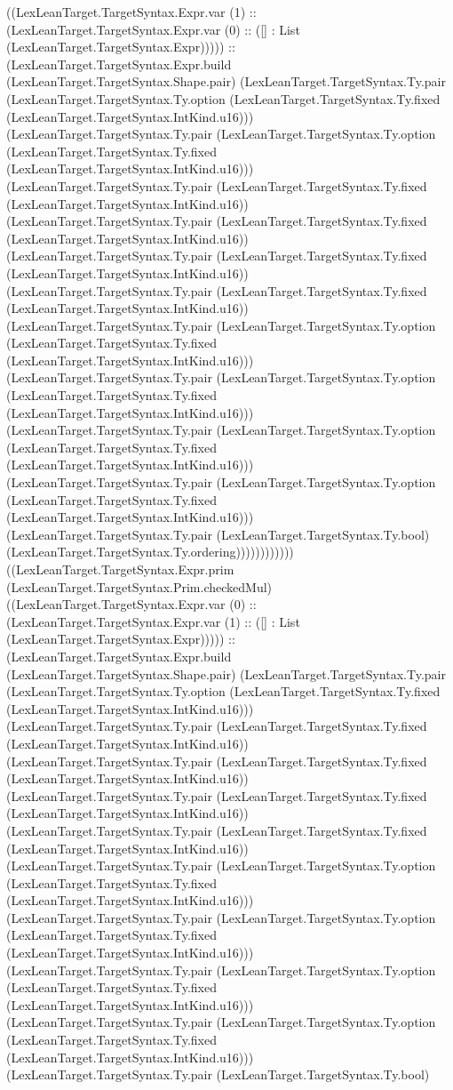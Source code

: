 \documentclass[11pt]{article}
\begin{document}
((LexLeanTarget.TargetSyntax.Expr.var (1) :: (LexLeanTarget.TargetSyntax.Expr.var (0) :: ([] : List (LexLeanTarget.TargetSyntax.Expr))))) :: (LexLeanTarget.TargetSyntax.Expr.build (LexLeanTarget.TargetSyntax.Shape.pair) (LexLeanTarget.TargetSyntax.Ty.pair (LexLeanTarget.TargetSyntax.Ty.option (LexLeanTarget.TargetSyntax.Ty.fixed (LexLeanTarget.TargetSyntax.IntKind.u16))) (LexLeanTarget.TargetSyntax.Ty.pair (LexLeanTarget.TargetSyntax.Ty.option (LexLeanTarget.TargetSyntax.Ty.fixed (LexLeanTarget.TargetSyntax.IntKind.u16))) (LexLeanTarget.TargetSyntax.Ty.pair (LexLeanTarget.TargetSyntax.Ty.fixed (LexLeanTarget.TargetSyntax.IntKind.u16)) (LexLeanTarget.TargetSyntax.Ty.pair (LexLeanTarget.TargetSyntax.Ty.fixed (LexLeanTarget.TargetSyntax.IntKind.u16)) (LexLeanTarget.TargetSyntax.Ty.pair (LexLeanTarget.TargetSyntax.Ty.fixed (LexLeanTarget.TargetSyntax.IntKind.u16)) (LexLeanTarget.TargetSyntax.Ty.pair (LexLeanTarget.TargetSyntax.Ty.fixed (LexLeanTarget.TargetSyntax.IntKind.u16)) (LexLeanTarget.TargetSyntax.Ty.pair (LexLeanTarget.TargetSyntax.Ty.option (LexLeanTarget.TargetSyntax.Ty.fixed (LexLeanTarget.TargetSyntax.IntKind.u16))) (LexLeanTarget.TargetSyntax.Ty.pair (LexLeanTarget.TargetSyntax.Ty.option (LexLeanTarget.TargetSyntax.Ty.fixed (LexLeanTarget.TargetSyntax.IntKind.u16))) (LexLeanTarget.TargetSyntax.Ty.pair (LexLeanTarget.TargetSyntax.Ty.option (LexLeanTarget.TargetSyntax.Ty.fixed (LexLeanTarget.TargetSyntax.IntKind.u16))) (LexLeanTarget.TargetSyntax.Ty.pair (LexLeanTarget.TargetSyntax.Ty.option (LexLeanTarget.TargetSyntax.Ty.fixed (LexLeanTarget.TargetSyntax.IntKind.u16))) (LexLeanTarget.TargetSyntax.Ty.pair (LexLeanTarget.TargetSyntax.Ty.bool) (LexLeanTarget.TargetSyntax.Ty.ordering)))))))))))) ((LexLeanTarget.TargetSyntax.Expr.prim (LexLeanTarget.TargetSyntax.Prim.checkedMul) ((LexLeanTarget.TargetSyntax.Expr.var (0) :: (LexLeanTarget.TargetSyntax.Expr.var (1) :: ([] : List (LexLeanTarget.TargetSyntax.Expr))))) :: (LexLeanTarget.TargetSyntax.Expr.build (LexLeanTarget.TargetSyntax.Shape.pair) (LexLeanTarget.TargetSyntax.Ty.pair (LexLeanTarget.TargetSyntax.Ty.option (LexLeanTarget.TargetSyntax.Ty.fixed (LexLeanTarget.TargetSyntax.IntKind.u16))) (LexLeanTarget.TargetSyntax.Ty.pair (LexLeanTarget.TargetSyntax.Ty.fixed (LexLeanTarget.TargetSyntax.IntKind.u16)) (LexLeanTarget.TargetSyntax.Ty.pair (LexLeanTarget.TargetSyntax.Ty.fixed (LexLeanTarget.TargetSyntax.IntKind.u16)) (LexLeanTarget.TargetSyntax.Ty.pair (LexLeanTarget.TargetSyntax.Ty.fixed (LexLeanTarget.TargetSyntax.IntKind.u16)) (LexLeanTarget.TargetSyntax.Ty.pair (LexLeanTarget.TargetSyntax.Ty.fixed (LexLeanTarget.TargetSyntax.IntKind.u16)) (LexLeanTarget.TargetSyntax.Ty.pair (LexLeanTarget.TargetSyntax.Ty.option (LexLeanTarget.TargetSyntax.Ty.fixed (LexLeanTarget.TargetSyntax.IntKind.u16))) (LexLeanTarget.TargetSyntax.Ty.pair (LexLeanTarget.TargetSyntax.Ty.option (LexLeanTarget.TargetSyntax.Ty.fixed (LexLeanTarget.TargetSyntax.IntKind.u16))) (LexLeanTarget.TargetSyntax.Ty.pair (LexLeanTarget.TargetSyntax.Ty.option (LexLeanTarget.TargetSyntax.Ty.fixed (LexLeanTarget.TargetSyntax.IntKind.u16))) (LexLeanTarget.TargetSyntax.Ty.pair (LexLeanTarget.TargetSyntax.Ty.option (LexLeanTarget.TargetSyntax.Ty.fixed (LexLeanTarget.TargetSyntax.IntKind.u16))) (LexLeanTarget.TargetSyntax.Ty.pair (LexLeanTarget.TargetSyntax.Ty.bool) 
\end{document}
